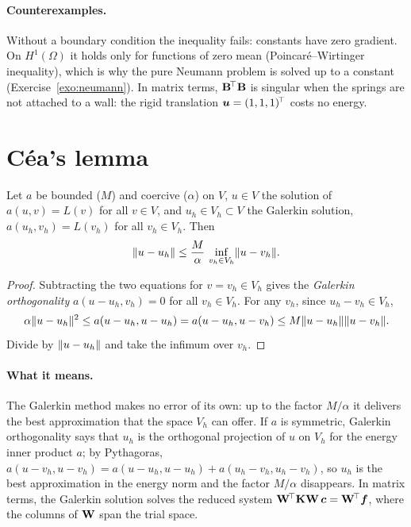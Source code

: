\paragraph{Counterexamples.} Without a boundary condition the inequality fails:
constants have zero gradient. On $H^1(\Omega)$ it holds only for functions of
zero mean (Poincar\'e--Wirtinger inequality), which is why the pure Neumann
problem is solved up to a constant (Exercise~\ref{exo:neumann}). In matrix
terms, $\mathbf{B}^{\!\top}\mathbf{B}$ is singular when the springs are not attached to a
wall: the rigid translation $\bm{u}=(1,1,1)^{\!\top}$ costs no energy.

\section{C\'ea's lemma}\label{sec:sp-cea}
%
\begin{theorem}[C\'ea]\label{thm:cea}
Let $a$ be bounded ($M$) and coercive ($\alpha$) on $V$, $u\in V$ the solution of
$a(u,v)=L(v)$ for all $v\in V$, and $u_h\in V_h\subset V$ the Galerkin solution,
$a(u_h,v_h)=L(v_h)$ for all $v_h\in V_h$. Then
\[
  \lVert u-u_h\rVert\le\frac M\alpha\,\inf_{v_h\in V_h}\lVert u-v_h\rVert .
\]
\end{theorem}
\begin{proof}
Subtracting the two equations for $v=v_h\in V_h$ gives the \emph{Galerkin
orthogonality} $a(u-u_h,v_h)=0$ for all $v_h\in V_h$. For any $v_h$, since
$u_h-v_h\in V_h$,
\[
  \alpha\lVert u-u_h\rVert^2\le a(u-u_h,u-u_h)=a(u-u_h,u-v_h)\le M\lVert u-u_h\rVert\lVert u-v_h\rVert.
\]
Divide by $\lVert u-u_h\rVert$ and take the infimum over $v_h$.
\end{proof}

\paragraph{What it means.} The Galerkin method makes no error of its own: up to
the factor $M/\alpha$ it delivers the best approximation that the space $V_h$
can offer. If $a$ is symmetric, Galerkin orthogonality says that $u_h$ is the
orthogonal projection of $u$ on $V_h$ for the energy inner product $a$; by
Pythagoras, $a(u-v_h,u-v_h)=a(u-u_h,u-u_h)+a(u_h-v_h,u_h-v_h)$, so $u_h$ is the
best approximation in the energy norm and the factor $M/\alpha$ disappears.
In matrix terms, the Galerkin solution solves the reduced system
$\mathbf{W}^{\!\top}\mathbf{K}\mathbf{W}\,\bm{c}=\mathbf{W}^{\!\top}\bm{f}$, where the columns of
$\mathbf{W}$ span the trial space.

